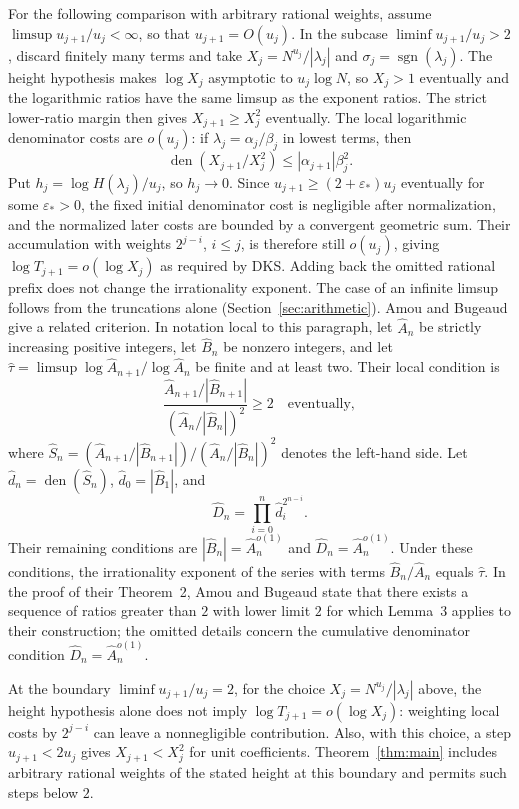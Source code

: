\documentclass{amsart}
\numberwithin{equation}{section}
\newcommand{\den}{\operatorname{den}}
\begin{document}
For the following comparison with arbitrary rational weights, assume\linebreak
$\limsup u_{j+1}/u_j<\infty$, so that $u_{j+1}=O(u_j)$. In the subcase
$\liminf u_{j+1}/u_j>2$, discard finitely many terms and take
$X_j=N^{u_j}/|\lambda_j|$ and $\sigma_j=\operatorname{sgn}(\lambda_j)$.
The height hypothesis makes $\log X_j$ asymptotic to $u_j\log N$, so
$X_j>1$ eventually and the logarithmic ratios have the same limsup as the
exponent ratios. The strict lower-ratio margin then gives
$X_{j+1}\ge X_j^2$ eventually. The local logarithmic denominator costs are
$o(u_j)$: if
$\lambda_j=\alpha_j/\beta_j$ in lowest terms, then
\[
\den(X_{j+1}/X_j^2)\le |\alpha_{j+1}|\beta_j^2.
\]
Put $h_j=\log H(\lambda_j)/u_j$, so $h_j\to0$.
Since $u_{j+1}\ge(2+\varepsilon_*)u_j$ eventually
for some $\varepsilon_*>0$, the fixed initial denominator cost is negligible
after normalization, and the normalized later costs are bounded by a
convergent geometric sum. Their accumulation with weights $2^{j-i}$, $i\le j$, is
therefore still $o(u_j)$, giving $\log T_{j+1}=o(\log X_j)$ as required by DKS.
Adding back the omitted rational prefix does not change the irrationality
exponent. The case of an infinite limsup follows from the truncations alone
(Section~\ref{sec:arithmetic}).
Amou and Bugeaud \cite[Lemma~3]{AB} give a related criterion.
In notation local to this paragraph, let $\widehat A_n$ be strictly increasing
positive integers, let $\widehat B_n$ be nonzero integers, and let
$\widehat\tau=\limsup\log \widehat A_{n+1}/\log \widehat A_n$ be finite and at least two.
Their local condition is
\[
\frac{\widehat A_{n+1}/|\widehat B_{n+1}|}{(\widehat A_n/|\widehat B_n|)^2}\ge2
\quad\text{eventually},
\]
where $\widehat S_n=(\widehat A_{n+1}/|\widehat B_{n+1}|)/(\widehat A_n/|\widehat B_n|)^2$
denotes the left-hand side. Let
$\widehat d_n=\den(\widehat S_n)$, $\widehat d_0=|\widehat B_1|$, and
\[
\widehat D_n=\prod_{i=0}^n \widehat d_i^{2^{n-i}}.
\]
Their remaining conditions are $|\widehat B_n|=\widehat A_n^{o(1)}$ and
$\widehat D_n=\widehat A_n^{o(1)}$. Under these conditions, the irrationality exponent of
the series with terms $\widehat B_n/\widehat A_n$ equals $\widehat\tau$.
In the proof of their Theorem~2, Amou and Bugeaud \cite[Section~5]{AB}
state that there exists a sequence of ratios greater than $2$ with lower
limit $2$ for which Lemma~3 applies to their construction; the omitted
details concern the cumulative denominator condition
$\widehat D_n=\widehat A_n^{o(1)}$.

At the boundary $\liminf u_{j+1}/u_j=2$, for the choice
$X_j=N^{u_j}/|\lambda_j|$ above, the height hypothesis alone
does not imply $\log T_{j+1}=o(\log X_j)$: weighting local costs by
$2^{j-i}$ can leave a nonnegligible contribution. Also, with this choice,
a step $u_{j+1}<2u_j$ gives $X_{j+1}<X_j^2$ for unit coefficients.
Theorem~\ref{thm:main} includes arbitrary rational weights of the stated
height at this boundary and permits such steps below $2$.
\end{document}
